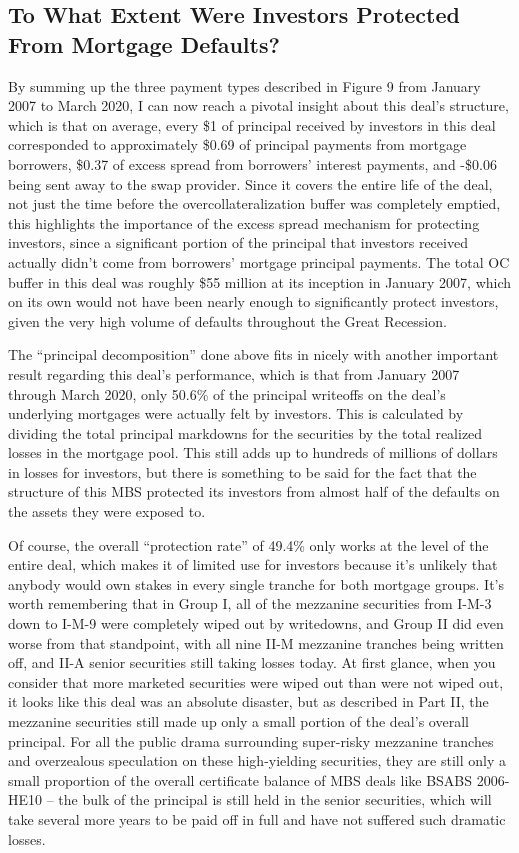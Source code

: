 \documentclass[12pt]{article}
\begin{document}
\subsection*{To What Extent Were Investors Protected From Mortgage Defaults?}

By summing up the three payment types described in Figure 9 from January 2007 to March 2020, I can now reach a pivotal insight about this deal’s structure, which is that on average, every \$1 of principal received by investors in this deal corresponded to approximately \$0.69 of principal payments from mortgage borrowers, \$0.37 of excess spread from borrowers’ interest payments, and -\$0.06 being sent away to the swap provider. Since it covers the entire life of the deal, not just the time before the overcollateralization buffer was completely emptied, this highlights the importance of the excess spread mechanism for protecting investors, since a significant portion of the principal that investors received actually didn’t come from borrowers’ mortgage principal payments. The total OC buffer in this deal was roughly \$55 million at its inception in January 2007, which on its own would not have been nearly enough to significantly protect investors, given the very high volume of defaults throughout the Great Recession.

The “principal decomposition” done above fits in nicely with another important result regarding this deal’s performance, which is that from January 2007 through March 2020, only 50.6\% of the principal writeoffs on the deal’s underlying mortgages were actually felt by investors. This is calculated by dividing the total principal markdowns for the securities by the total realized losses in the mortgage pool. This still adds up to hundreds of millions of dollars in losses for investors, but there is something to be said for the fact that the structure of this MBS protected its investors from almost half of the defaults on the assets they were exposed to.
	
Of course, the overall “protection rate” of 49.4\% only works at the level of the entire deal, which makes it of limited use for investors because it’s unlikely that anybody would own stakes in every single tranche for both mortgage groups. It’s worth remembering that in Group I, all of the mezzanine securities from I-M-3 down to I-M-9 were completely wiped out by writedowns, and Group II did even worse from that standpoint, with all nine II-M mezzanine tranches being written off, and II-A senior securities still taking losses today. At first glance, when you consider that more marketed securities were wiped out than were not wiped out, it looks like this deal was an absolute disaster, but as described in Part II, the mezzanine securities still made up only a small portion of the deal’s overall principal. For all the public drama surrounding super-risky mezzanine tranches and overzealous speculation on these high-yielding securities, they are still only a small proportion of the overall certificate balance of MBS deals like BSABS 2006-HE10 – the bulk of the principal is still held in the senior securities, which will take several more years to be paid off in full and have not suffered such dramatic losses.
\end{document}
